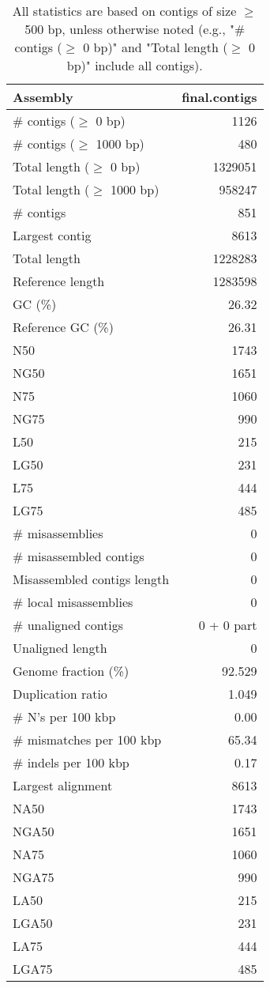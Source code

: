 \documentclass[12pt,a4paper]{article}
\begin{document}
\begin{table}[ht]
\begin{center}
\caption{All statistics are based on contigs of size $\geq$ 500 bp, unless otherwise noted (e.g., "\# contigs ($\geq$ 0 bp)" and "Total length ($\geq$ 0 bp)" include all contigs).}
\begin{tabular}{|l*{1}{|r}|}
\hline
Assembly & final.contigs \\ \hline
\# contigs ($\geq$ 0 bp) & 1126 \\ \hline
\# contigs ($\geq$ 1000 bp) & 480 \\ \hline
Total length ($\geq$ 0 bp) & 1329051 \\ \hline
Total length ($\geq$ 1000 bp) & 958247 \\ \hline
\# contigs & 851 \\ \hline
Largest contig & 8613 \\ \hline
Total length & 1228283 \\ \hline
Reference length & 1283598 \\ \hline
GC (\%) & 26.32 \\ \hline
Reference GC (\%) & 26.31 \\ \hline
N50 & 1743 \\ \hline
NG50 & 1651 \\ \hline
N75 & 1060 \\ \hline
NG75 & 990 \\ \hline
L50 & 215 \\ \hline
LG50 & 231 \\ \hline
L75 & 444 \\ \hline
LG75 & 485 \\ \hline
\# misassemblies & 0 \\ \hline
\# misassembled contigs & 0 \\ \hline
Misassembled contigs length & 0 \\ \hline
\# local misassemblies & 0 \\ \hline
\# unaligned contigs & 0 + 0 part \\ \hline
Unaligned length & 0 \\ \hline
Genome fraction (\%) & 92.529 \\ \hline
Duplication ratio & 1.049 \\ \hline
\# N's per 100 kbp & 0.00 \\ \hline
\# mismatches per 100 kbp & 65.34 \\ \hline
\# indels per 100 kbp & 0.17 \\ \hline
Largest alignment & 8613 \\ \hline
NA50 & 1743 \\ \hline
NGA50 & 1651 \\ \hline
NA75 & 1060 \\ \hline
NGA75 & 990 \\ \hline
LA50 & 215 \\ \hline
LGA50 & 231 \\ \hline
LA75 & 444 \\ \hline
LGA75 & 485 \\ \hline
\end{tabular}
\end{center}
\end{table}
\end{document}

